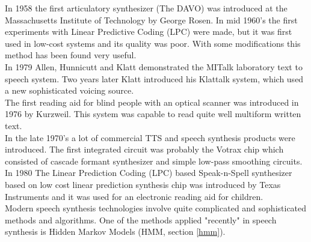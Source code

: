 In 1958 the first articulatory synthesizer (The DAVO) was introduced at the Massachusetts Institute of Technology by George Rosen. In mid 1960's the first experiments with Linear Predictive Coding (LPC) were made, but it was first used in low-cost systems and its quality was poor. With some modifications this method has been found very useful.\\
In 1979 Allen, Hunnicutt and Klatt demonstrated the MITalk laboratory text to speech system. Two years later Klatt introduced his Klattalk system, which used a new sophisticated voicing source.\\
The first reading aid for blind people with an optical scanner was introduced in 1976 by Kurzweil. This system was capable to read quite well multiform written text.\\
In the late 1970's a lot of commercial TTS and speech synthesis products were introduced. The first integrated circuit was probably the Votrax chip which consisted of cascade formant synthesizer and simple low-pass smoothing circuits. In 1980 The Linear Prediction Coding (LPC) based Speak-n-Spell synthesizer based on low cost linear prediction synthesis chip was introduced by Texas Instruments and it was used for an electronic reading aid for children.\\
Modern speech synthesis technologies involve quite complicated and sophisticated methods and algorithms. One of the methods applied "recently" in speech synthesis is Hidden Markov Models (HMM, section \ref{hmm}).